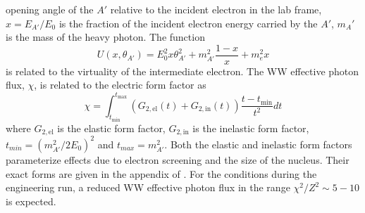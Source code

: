 opening angle of the $A'$ relative to the incident electron in the lab frame, 
$x = E_{A'}/E_{0}$ is the fraction of the incident electron energy carried by
the $A'$, $m_A'$ is the mass of the heavy photon. The function 
\begin{equation}
    U(x, \theta_{A'}) = E_{0}^{2}x\theta_{A'}^{2} 
    + m_{A'}^{2}\frac{1-x}{x} + m_{e}^2 x
\end{equation}
is related to the virtuality of the intermediate electron.  The WW effective
photon flux, $\chi$, is related to the electric form factor as
\begin{equation}
    \chi = \int_{t_{\text{min}}}^{t_{\text{max}}} \left(G_{2,\text{el}}(t) + G_{2,\text{in}}(t) \right) \frac{t - t_{\text{min}}}{t^2} dt
\end{equation}
where $G_{2,\text{el}}$ is the elastic form factor, $G_{2,\text{in}}$ is the inelastic form
factor, $t_{min} = (m^2_{A'}/2E_{0})^2$ and $t_{max} = m_{A'}^2$.  Both the 
elastic and inelastic form factors parameterize effects due to electron screening
and the size of the nucleus.  Their exact forms are given in the appendix of 
\cite{Bjorken:2009mm}.  For the conditions during the engineering run, a reduced
WW effective photon flux in the range $\chi^2/Z^2 \sim 5 - 10$ is expected.

